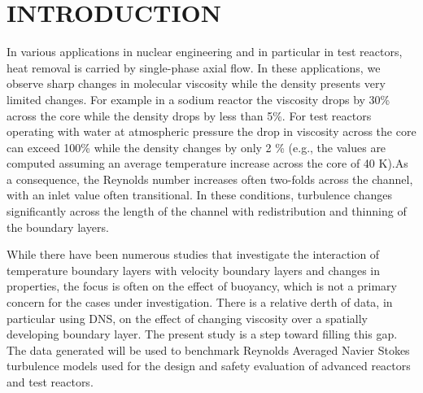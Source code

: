 \documentclass[twocolumn,10pt]{asme2e}
\begin{document}
\section*{INTRODUCTION}
In various applications in nuclear engineering and in particular in test reactors, heat removal is carried by single-phase axial flow. In these applications, we observe sharp changes in molecular viscosity while the density presents very limited changes.  For example in a sodium reactor the viscosity drops by 30\% across the core \cite{finkthermodynamic} while the density drops by less than 5\%.  For test reactors operating with water at atmospheric pressure the drop in viscosity across the core can exceed 100\% while the density changes by only 2 \% (e.g., the values are computed assuming an average temperature increase across the core of 40 K).As a consequence, the Reynolds number increases often two-folds across the channel, with an inlet value often transitional.  In these conditions, turbulence changes significantly across the length of the channel with redistribution and thinning of the boundary layers.

While there have been numerous studies that investigate the interaction of temperature boundary layers with velocity boundary layers and changes in properties, the focus is often on the effect of buoyancy, which is not a primary concern for the cases under investigation. There is a relative derth of data, in particular using DNS, on the effect of changing viscosity over a spatially developing boundary layer. The present study is a step toward filling this  gap. The data generated will be used to benchmark Reynolds Averaged Navier Stokes turbulence models used for the design and safety evaluation of advanced reactors and test reactors.
\end{document}
